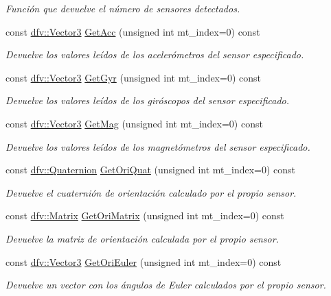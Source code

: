 \begin{DoxyCompactItemize}
\begin{DoxyCompactList}\small\item\em \-Función que devuelve el número de sensores detectados. \end{DoxyCompactList}\item 
const \hyperlink{classdfv_1_1Vector3}{dfv\-::\-Vector3} \hyperlink{classdfv_1_1XsensListener_a940577a890abfe31a9f765766abbb0ec}{\-Get\-Acc} (unsigned int mt\-\_\-index=0) const 
\begin{DoxyCompactList}\small\item\em \-Devuelve los valores leídos de los acelerómetros del sensor especificado. \end{DoxyCompactList}\item 
const \hyperlink{classdfv_1_1Vector3}{dfv\-::\-Vector3} \hyperlink{classdfv_1_1XsensListener_a3896a0a58d557a5e9299415a146d80ed}{\-Get\-Gyr} (unsigned int mt\-\_\-index=0) const 
\begin{DoxyCompactList}\small\item\em \-Devuelve los valores leídos de los giróscopos del sensor especificado. \end{DoxyCompactList}\item 
const \hyperlink{classdfv_1_1Vector3}{dfv\-::\-Vector3} \hyperlink{classdfv_1_1XsensListener_a5eb779af51de20f10434711cb06ea153}{\-Get\-Mag} (unsigned int mt\-\_\-index=0) const 
\begin{DoxyCompactList}\small\item\em \-Devuelve los valores leídos de los magnetómetros del sensor especificado. \end{DoxyCompactList}\item 
const \hyperlink{classdfv_1_1Quaternion}{dfv\-::\-Quaternion} \hyperlink{classdfv_1_1XsensListener_a882a444ecd1452f22381e20780c97631}{\-Get\-Ori\-Quat} (unsigned int mt\-\_\-index=0) const 
\begin{DoxyCompactList}\small\item\em \-Devuelve el cuaternión de orientación calculado por el propio sensor. \end{DoxyCompactList}\item 
const \hyperlink{classdfv_1_1Matrix}{dfv\-::\-Matrix} \hyperlink{classdfv_1_1XsensListener_a8949e2302c992ae4d78132574ccb4c27}{\-Get\-Ori\-Matrix} (unsigned int mt\-\_\-index=0) const 
\begin{DoxyCompactList}\small\item\em \-Devuelve la matriz de orientación calculada por el propio sensor. \end{DoxyCompactList}\item 
const \hyperlink{classdfv_1_1Vector3}{dfv\-::\-Vector3} \hyperlink{classdfv_1_1XsensListener_a5680dd82710f4eb73521c614293da8f4}{\-Get\-Ori\-Euler} (unsigned int mt\-\_\-index=0) const 
\begin{DoxyCompactList}\small\item\em \-Devuelve un vector con los ángulos de \-Euler calculados por el propio sensor. \end{DoxyCompactList}\end{DoxyCompactItemize}


